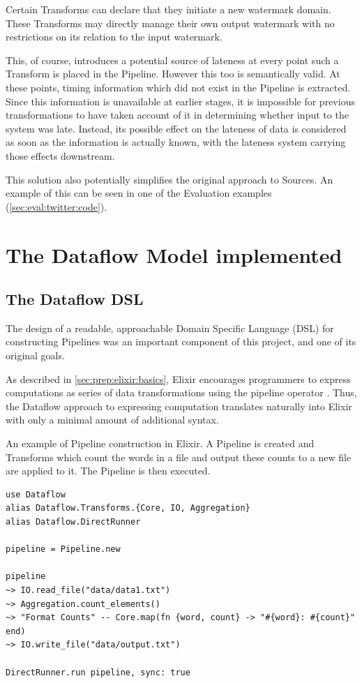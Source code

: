 Certain Transforms can declare that they initiate a new watermark domain.
These Transforms may directly manage their own output watermark with no restrictions on its relation to the input watermark.

This, of course, introduces a potential source of lateness at every point such a Transform is placed in the Pipeline.
However this too is semantically valid.
At these points, timing information which did not exist in the Pipeline is extracted.
Since this information is unavailable at earlier stages, it is impossible for previous transformations to have taken account of it in determining whether input to the system was late.
Instead, its possible effect on the lateness of data is considered as soon as the information is actually known, with the lateness system carrying those effects downstream.

This solution also potentially simplifies the original approach to Sources.
An example of this can be seen in one of the Evaluation examples (\cref{sec:eval:twitter:code}).

\section{The Dataflow Model implemented}\label{sec:impl:approach}

\subsection{The Dataflow DSL}\label{sec:impl:approach:dsl}

The design of a readable, approachable Domain Specific Language (DSL) for constructing Pipelines was an important component of this project, and one of its original goals.



As described in \cref{sec:prep:elixir:basics}, Elixir encourages programmers to express computations as series of data transformations using the pipeline operator \exs{|>}.
Thus, the Dataflow approach to expressing computation translates naturally into Elixir with only a minimal amount of additional syntax.

\begin{listing}[h]
	\caption[An example of Pipeline construction in Elixir.]{An example of Pipeline construction in Elixir. A Pipeline is created and Transforms which count the words in a file and output these counts to a new file are applied to it. The Pipeline is then executed.}
	\label{lst:impl:elixir-construct-pipeline}
	\begin{verbatim}
use Dataflow
alias Dataflow.Transforms.{Core, IO, Aggregation}
alias Dataflow.DirectRunner

pipeline = Pipeline.new

pipeline
~> IO.read_file("data/data1.txt")
~> Aggregation.count_elements()
~> "Format Counts" -- Core.map(fn {word, count} -> "#{word}: #{count}" end)
~> IO.write_file("data/output.txt")

DirectRunner.run pipeline, sync: true

	\end{verbatim}
\end{listing}

